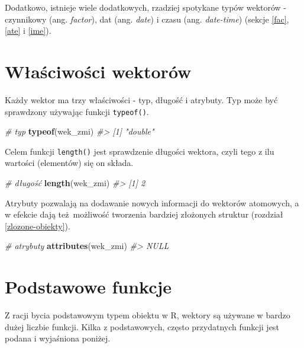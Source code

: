 \documentclass[paper=6in:9in,pagesize=pdftex,headinclude=on,footinclude=on,10pt]{scrbook}
\newenvironment{Shaded}{\begin{snugshade}}{\end{snugshade}}
\newcommand{\CommentTok}[1]{\textcolor[rgb]{0.56,0.35,0.01}{\textit{#1}}}
\newcommand{\KeywordTok}[1]{\textcolor[rgb]{0.13,0.29,0.53}{\textbf{#1}}}
\newcommand{\NormalTok}[1]{#1}
\begin{document}
Dodatkowo, istnieje wiele dodatkowych, rzadziej spotykane typów wektorów - czynnikowy (ang. \emph{factor}), dat (ang. \emph{date}) i czasu (ang. \emph{date-time}) (sekcje \ref{fac}, \ref{ate} i \ref{ime}).

\hypertarget{wux142aux15bciwoux15bci-wektoruxf3w}{%
\section{Właściwości wektorów}\label{wux142aux15bciwoux15bci-wektoruxf3w}}

Każdy wektor ma trzy właściwości - typ, długość i atrybuty.
Typ może być sprawdzony używając funkcji \texttt{typeof()}.

\begin{Shaded}
\begin{Highlighting}[]
\CommentTok{# typ}
\KeywordTok{typeof}\NormalTok{(wek_zmi)}
\CommentTok{#> [1] "double"}
\end{Highlighting}
\end{Shaded}

Celem funkcji \texttt{length()} jest sprawdzenie długości wektora, czyli tego z ilu wartości (elementów) się on składa.

\begin{Shaded}
\begin{Highlighting}[]
\CommentTok{# długość}
\KeywordTok{length}\NormalTok{(wek_zmi)}
\CommentTok{#> [1] 2}
\end{Highlighting}
\end{Shaded}

Atrybuty pozwalają na dodawanie nowych informacji do wektorów atomowych, a w efekcie dają też~możliwość tworzenia bardziej złożonych struktur (rozdział \ref{zlozone-obiekty}).

\begin{Shaded}
\begin{Highlighting}[]
\CommentTok{# atrybuty}
\KeywordTok{attributes}\NormalTok{(wek_zmi)}
\CommentTok{#> NULL}
\end{Highlighting}
\end{Shaded}

\hypertarget{pf-vector}{%
\section{Podstawowe funkcje}\label{pf-vector}}

Z racji bycia podstawowym typem obiektu w R, wektory są używane w bardzo dużej liczbie funkcji.
Kilka z podstawowych, często przydatnych funkcji jest podana i wyjaśniona poniżej.
\end{document}
